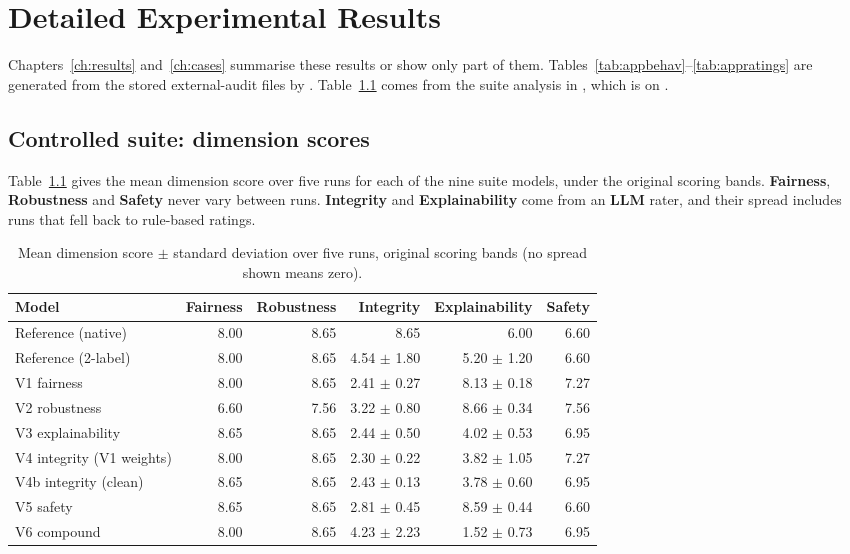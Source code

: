 \appendix
\chapter{Detailed Experimental Results}\label{app:results}

Chapters~\ref{ch:results} and~\ref{ch:cases} summarise these results or show only part of them. Tables~\ref{tab:appbehav}--\ref{tab:appratings} are generated from the stored external-audit files by . Table~\ref{tab:appsuite} comes from the suite analysis in , which is on .

\section{Controlled suite: dimension scores}
Table~\ref{tab:appsuite} gives the mean dimension score over five runs for each of the nine suite models, under the original scoring bands. \textbf{Fairness}, \textbf{Robustness} and \textbf{Safety} never vary between runs. \textbf{Integrity} and \textbf{Explainability} come from an \textbf{LLM} rater, and their spread includes runs that fell back to rule-based ratings.

\begin{table}[!htbp]
\centering\small
\caption{Mean dimension score $\pm$ standard deviation over five runs, original scoring bands (no spread shown means zero).}\label{tab:appsuite}
\begin{tabularx}{\textwidth}{|>{\raggedright\arraybackslash}p{3.6cm}|r|r|r|r|r|}
\hline
\textbf{Model} & \textbf{Fairness} & \textbf{Robustness} & \textbf{Integrity} & \textbf{Explainability} & \textbf{Safety}\\
\hline
Reference (native) & 8.00 & 8.65 & 8.65 & 6.00 & 6.60\\ \hline
Reference (2-label) & 8.00 & 8.65 & 4.54 $\pm$ 1.80 & 5.20 $\pm$ 1.20 & 6.60\\ \hline
V1 fairness & 8.00 & 8.65 & 2.41 $\pm$ 0.27 & 8.13 $\pm$ 0.18 & 7.27\\ \hline
V2 robustness & 6.60 & 7.56 & 3.22 $\pm$ 0.80 & 8.66 $\pm$ 0.34 & 7.56\\ \hline
V3 explainability & 8.65 & 8.65 & 2.44 $\pm$ 0.50 & 4.02 $\pm$ 0.53 & 6.95\\ \hline
V4 integrity (V1 weights) & 8.00 & 8.65 & 2.30 $\pm$ 0.22 & 3.82 $\pm$ 1.05 & 7.27\\ \hline
V4b integrity (clean) & 8.65 & 8.65 & 2.43 $\pm$ 0.13 & 3.78 $\pm$ 0.60 & 6.95\\ \hline
V5 safety & 8.65 & 8.65 & 2.81 $\pm$ 0.45 & 8.59 $\pm$ 0.44 & 6.60\\ \hline
V6 compound & 8.00 & 8.65 & 4.23 $\pm$ 2.23 & 1.52 $\pm$ 0.73 & 6.95\\
\hline
\end{tabularx}
\end{table}

